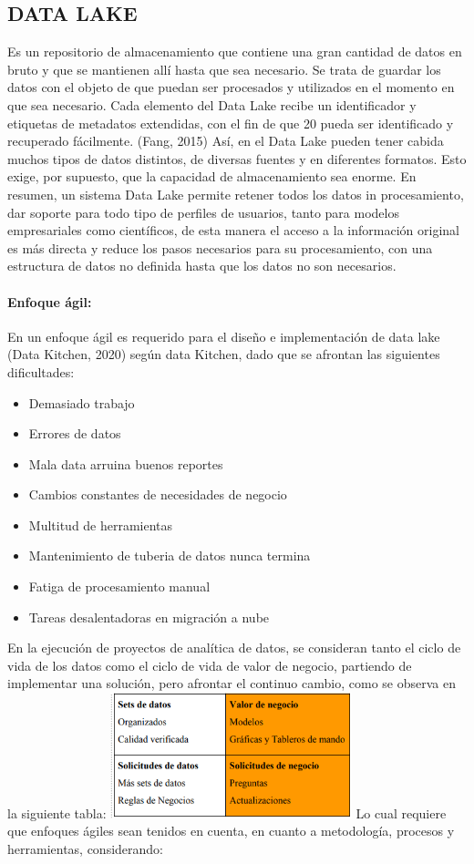 \documentclass[twoside,twocolumn]{article}
\begin{document}
\subsection{DATA LAKE}
Es un repositorio de almacenamiento que contiene una gran cantidad de datos en bruto y que se mantienen allí hasta que sea necesario. Se trata de guardar los datos con el objeto de que puedan ser procesados y utilizados en el momento en que sea necesario. Cada elemento del Data Lake recibe un identificador y etiquetas de metadatos extendidas, con el fin de que 20 pueda ser identificado y recuperado fácilmente. (Fang, 2015) Así, en el Data Lake pueden tener cabida muchos tipos de datos distintos, de diversas fuentes y en diferentes formatos. Esto exige, por supuesto, que la capacidad de almacenamiento sea enorme. En resumen, un sistema Data Lake permite retener todos los datos in procesamiento, dar soporte para todo tipo de perfiles de usuarios, tanto para modelos empresariales como científicos, de esta manera el acceso a la información original es más directa y reduce los pasos necesarios para su procesamiento, con una estructura de datos no definida hasta que los datos no son necesarios. 

\paragraph{Enfoque ágil:}
En un enfoque ágil es requerido para el diseño e implementación de data lake (Data Kitchen, 
2020) según data Kitchen, dado que se afrontan las siguientes dificultades: 

\begin{itemize}
    \item Demasiado trabajo
    \item Errores de datos
    \item Mala data arruina buenos reportes
    \item Cambios constantes de necesidades de negocio 
    \item Multitud de herramientas
    \item Mantenimiento de tuberia de datos nunca termina
    \item Fatiga de procesamiento manual
    \item Tareas desalentadoras en migración a nube
\end{itemize}

En la ejecución de proyectos de analítica de datos, se consideran tanto el ciclo de vida de los 
datos como el ciclo de vida de valor de negocio, partiendo de implementar una solución, pero 
afrontar el continuo cambio, como se observa en la siguiente tabla:
\includegraphics[width=7cm]{imagenes/img5.png}
Lo cual requiere que enfoques ágiles sean tenidos en cuenta, en cuanto a metodología, 
procesos y herramientas, considerando: 
\end{document}
